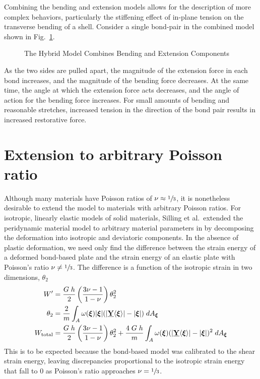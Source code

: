 Combining the bending and extension models allows for the description of more complex behaviors, particularly the stiffening effect of in-plane tension on the transverse bending of a shell.  Consider a single bond-pair in the combined model shown in Fig.~\ref{fig:hybridmodel}.
%
\begin{figure}[tbp]
  \centering
  
  \caption{The Hybrid Model Combines Bending and Extension Components}
  \label{fig:hybridmodel}
\end{figure}
%
As the two sides are pulled apart, the magnitude of the extension force in each bond increases, and the magnitude of the bending force decreases.  At the same time, the angle at which the extension force acts decreases, and the angle of action for the bending force increases.  For small amounts of bending and reasonable stretches, increased tension in the direction of the bond pair results in increased restorative force.
\section{Extension to arbitrary Poisson ratio}
\label{sec:arbitrary}
Although many materials have Poisson ratios of \(\nu\approx \sfrac{1}{3}\), it is nonetheless desirable to extend the model to materials with arbitrary Poisson ratios.  For isotropic, linearly elastic models of solid materials, Silling et al.\ extended the peridynamic material model to arbitrary material parameters in \cite{silling2007peridynamic} by decomposing the deformation into isotropic and deviatoric components.  In the absence of plastic deformation, we need only find the difference between the strain energy of a deformed bond-based plate and the strain energy of an elastic plate with Poisson's ratio \(\nu \neq \sfrac{1}{3}\).  The difference is a function of the isotropic strain in two dimensions, \(\theta_2\)
%
\begin{align}
    W' &= \frac{G\;h}{2}\left(\frac{3\nu-1}{1-\nu}\right)\theta_2^2 \notag \\
    \theta_2 &= \frac{2}{m}\int_A \omega(\boldsymbol{\xi})|\boldsymbol{\xi}|(|\vstate{Y}{}{\boldsymbol{\xi}}|-|\boldsymbol{\xi}|)\;dA_{\boldsymbol{\xi}} \notag \\
    W_\text{total} &= \frac{G\;h}{2}\left(\frac{3\nu-1}{1-\nu}\right)\theta_2^2 + \frac{4\;G\;h}{m}\int_A \omega(\boldsymbol{\xi})(|\vstate{Y}{}{\boldsymbol{\xi}}|-|\boldsymbol{\xi}|)^2\;dA_{\boldsymbol{\xi}}\notag
\end{align}
%
This is to be expected because the bond-based model was calibrated to the shear strain energy, leaving discrepancies proportional to the isotropic strain energy that fall to 0 as Poisson's ratio approaches \(\nu = \sfrac{1}{3}\).

